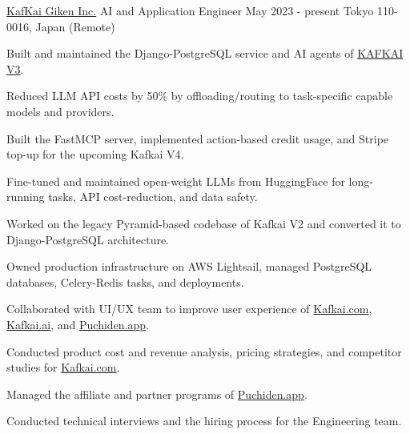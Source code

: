 \begin{cventries}


\cventry
    {\href{https://kafkai.com/}{KafKai Giken Inc.}} %
    {AI and Application Engineer} %
    {May 2023 - present} %
    {Tokyo 110-0016, Japan (Remote)} %
    {
      \begin{cvitems} %
        \item{Built and maintained the Django-PostgreSQL service and AI agents of \href{https://kafkai.com/}{\textcolor{Cerulean}{KAFKAI V3}}.}
        \item{Reduced LLM API costs by 50\% by offloading/routing to task-specific capable models and providers.}
        \item{Built the FastMCP server, implemented action-based credit usage, and Stripe top-up for the upcoming Kafkai V4.}
        \item{Fine-tuned and maintained open-weight LLMs from HuggingFace for long-running tasks, API cost-reduction, and data safety.}
        \item{Worked on the legacy Pyramid-based codebase of Kafkai V2 and converted it to Django-PostgreSQL architecture.}
        \item{Owned production infrastructure on AWS Lightsail, managed PostgreSQL databases, Celery-Redis tasks, and deployments.}
        \item{Collaborated with UI/UX team to improve user experience of \href{https://kafkai.com/}{\textcolor{Cerulean}{Kafkai.com}}, \href{https://kafkai.ai/}{\textcolor{Cerulean}{Kafkai.ai}}, and \href{https://puchiden.app/}{\textcolor{Cerulean}{Puchiden.app}}.}
        \item{Conducted product cost and revenue analysis, pricing strategies, and competitor studies for \href{https://kafkai.com/}{\textcolor{Cerulean}{Kafkai.com}}.}
        \item{Managed the affiliate and partner programs of \href{https://puchiden.app/}{\textcolor{Cerulean}{Puchiden.app}}.}
        \item{Conducted technical interviews and the hiring process for the Engineering team.}
      \end{cvitems}
    }


\end{cventries}
